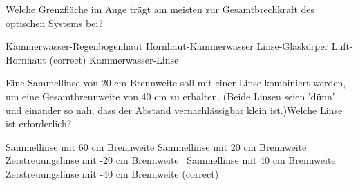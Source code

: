 \documentclass[11pt]{exam}
\begin{document}
\begin{questions}
\vspace{3mm}\question Welche Grenzfläche im Auge trägt am meisten zur Gesamtbrechkraft des optischen Systems bei?

\begin{choices}
	\choice Kammerwasser-Regenbogenhaut
	\choice Hornhaut-Kammerwasser
	\choice Linse-Glaskörper
	\choice Luft-Hornhaut (correct)
	\choice Kammerwasser-Linse
\end{choices}

\vspace{3mm}\question Eine Sammellinse von 20 cm Brennweite soll mit einer Linse kombiniert werden, um eine Gesamtbrennweite von 40 cm zu erhalten. (Beide Linsen seien ’dünn’ und einander so nah, dass der Abstand vernachlässigbar klein ist.)Welche Linse ist erforderlich?

\begin{choices}
	\choice Sammellinse mit 60 cm Brennweite
	\choice Sammellinse mit 20 cm Brennweite
	\choice Zerstreuungslinse mit -20 cm Brennweite
	\choice  Sammellinse mit 40 cm Brennweite
	\choice Zerstreuungslinse mit -40 cm Brennweite (correct)
\end{choices}

\vspace{3mm}\end{questions}
\end{document}
